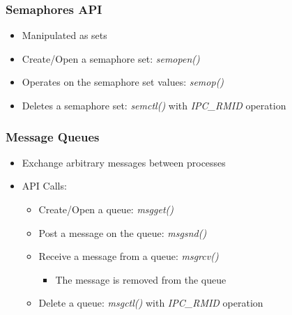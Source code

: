 \begin{frame}
  \frametitle{Semaphores API}

  \begin{itemize}
  \item Manipulated as sets
  \item Create/Open a semaphore set: \emph{semopen()}
  \item Operates on the semaphore set values: \emph{semop()}
  \item Deletes a semaphore set: \emph{semctl()} with \emph{IPC\_RMID} operation
  \end{itemize}
\end{frame}


\begin{frame}
  \frametitle{Message Queues}

  \begin{itemize}
  \item Exchange arbitrary messages between processes
  \item API Calls:
    \begin{itemize}
    \item Create/Open a queue: \emph{msgget()}
    \item Post a message on the queue: \emph{msgsnd()}
    \item Receive a message from a queue: \emph{msgrcv()}
      \begin{itemize}
      \item The message is removed from the queue
      \end{itemize}
    \item Delete a queue: \emph{msgctl()} with \emph{IPC\_RMID} operation
    \end{itemize}
  \end{itemize}
\end{frame}
